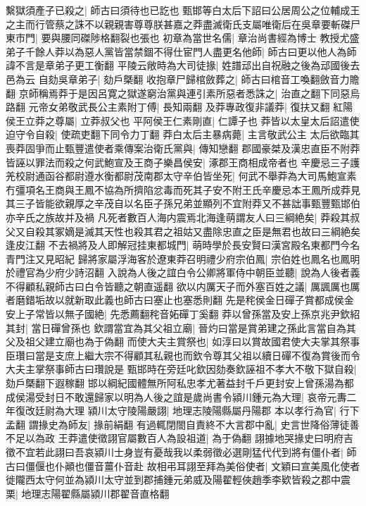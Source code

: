 繫獄須產子已殺之|{
	師古曰須待也已訖也}
甄邯等白太后下詔曰公居周公之位輔成王之主而行管蔡之誅不以親親害尊尊朕甚嘉之莽盡滅衛氏支屬唯衛后在吳章要斬磔尸東市門|{
	要與腰同磔陟格翻裂也張也}
初章為當世名儒|{
	章治尚書經為博士}
教授尤盛弟子千餘人莽以為惡人黨皆當禁錮不得仕宦門人盡更名他師|{
	師古曰更以他人為師諱不言是章弟子更工衡翻}
平陵云敞時為大司徒掾|{
	姓譜䢵出自祝融之後為䢵國後去邑為云}
自劾吳章弟子|{
	劾戶槩翻}
收抱章尸歸棺斂葬之|{
	師古曰棺音工喚翻斂音力贍翻}
京師稱焉莽于是因呂寛之獄遂窮治黨與連引素所惡者悉誅之|{
	治直之翻下同惡烏路翻}
元帝女弟敬武長公主素附丁傅|{
	長知兩翻}
及莽專政復非議莽|{
	復扶又翻}
紅陽侯王立莽之尊屬|{
	立莽叔父也}
平阿侯王仁素剛直|{
	仁譚子也}
莽皆以太皇太后詔遣使迫守令自殺|{
	使疏吏翻下同令力丁翻}
莽白太后主暴病薨|{
	主言敬武公主}
太后欲臨其喪莽固爭而止甄豐遣使者乘傳案治衛氏黨與|{
	傳知戀翻}
郡國豪桀及漢忠直臣不附莽皆誣以罪法而殺之何武鮑宣及王商子樂昌侯安|{
	涿郡王商相成帝者也}
辛慶忌三子護羌校尉通函谷都尉遵水衡都尉茂南郡太守辛伯皆坐死|{
	何武不舉莽為大司馬鮑宣素冇彊項名王商與王鳳不協為所擠陷忿毒而死其子安不附王氏辛慶忌本王鳳所成莽見其三子皆能欲親厚之辛茂自以名臣子孫兄弟並顯列不宜附莽又不甚詘事甄豐甄邯伯亦辛氏之族故并及禍}
凡死者數百人海内震焉北海逢萌謂友人曰三綱絶矣|{
	莽殺其叔父又自殺其冢嫡是滅其天性也殺其君之祖姑又盡除忠直之臣是無君也故曰三綱絶矣逢皮江翻}
不去禍將及人即解冠挂東都城門|{
	萌時學於長安賢曰漢宮殿名東都門今名青門注又見昭紀}
歸將家屬浮海客於遼東莽召明禮少府宗伯鳳|{
	宗伯姓也鳳名也鳳明於禮官為少府少詩沼翻}
入說為人後之誼白令公卿將軍侍中朝臣並聽|{
	說為人後者義不得顧私親師古曰白令皆聽之朝直遥翻}
欲以内厲天子而外塞百姓之議|{
	厲諷厲也厲者磨錯垢故以就新取此義也師古曰塞止也塞悉則翻}
先是秺侯金日磾子賞都成侯金安上子常皆以無子國絶|{
	先悉薦翻秺音妬磾丁奚翻}
莽以曾孫當及安上孫京兆尹欽紹其封|{
	當日磾曾孫也}
欽謂當宜為其父祖立廟|{
	晉灼曰當是賞弟建之孫此言當自為其父及祖父建立廟也為于偽翻}
而使大夫主賞祭也|{
	如淳曰以賞故國君使大夫掌其祭事臣瓚曰當是支庶上繼大宗不得顧其私親也而欽令尊其父祖以續日磾不復為賞後而令大夫主掌祭事師古曰瓚說是}
甄邯時在旁廷叱欽因劾奏欽誣祖不孝大不敬下獄自殺|{
	劾戶槩翻下遐稼翻}
邯以綱紀國體無所阿私忠孝尤著益封千戶更封安上曾孫湯為都成侯湯受封日不敢還歸家以明為人後之誼是歲尚書令潁川鍾元為大理|{
	哀帝元夀二年復改廷尉為大理}
潁川太守陵陽嚴詡|{
	地理志陵陽縣屬丹陽郡}
本以孝行為官|{
	行下孟翻}
謂掾史為師友|{
	掾前絹翻}
有過輒閉閤自責終不大言郡中亂|{
	史言世降俗薄徒善不足以為政}
王莽遣使徵詡官屬數百人為設祖道|{
	為于偽翻}
詡據地哭掾史曰明府吉徵不宜若此詡曰吾哀潁川士身豈有憂哉我以柔弱徵必選剛猛代代到將有僵仆者|{
	師古曰僵偃也仆顚也僵音薑仆音赴}
故相弔耳詡至拜為美俗使者|{
	文穎曰宣美風化使者}
徙隴西太守何並為潁川太守並到郡捕鍾元弟威及陽翟輕俠趙季李欵皆殺之郡中震栗|{
	地理志陽翟縣屬潁川郡翟音直格翻}


